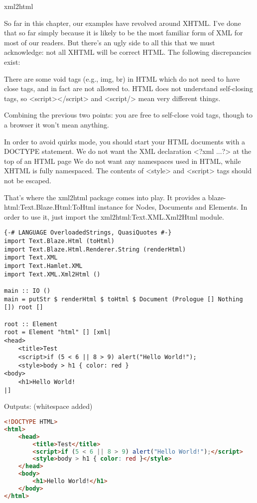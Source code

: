 xml2html

So far in this chapter, our examples have revolved around XHTML. I've done that so far
simply because it is likely to be the most familiar form of XML for most of our readers. But
there's an ugly side to all this that we must acknowledge: not all XHTML will be correct HTML.
The following discrepancies exist:

  
There are some void tags (e.g., img, br) in HTML
which do not need to have close tags, and in fact are not allowed to.
HTML does not understand self-closing tags, so <script></script> and
<script/> mean very different things.

Combining the previous two points: you are free to self-close void tags, though to a browser
it won't mean anything.

In order to avoid quirks mode, you should start your HTML documents with a
DOCTYPE statement.
We do not want the XML declaration <?xml ...?> at the top of an HTML page
We do not want any namespaces used in HTML, while XHTML is fully namespaced.
The contents of <style> and <script>
tags should not be escaped.
  
That's where the xml2html package comes into play. It provides a
blaze-html:Text.Blaze.Html:ToHtml instance for Nodes,
Documents and Elements. In order to use it, just import the
xml2html:Text.XML.Xml2Html module.

\begin{lstlisting}
{-# LANGUAGE OverloadedStrings, QuasiQuotes #-}
import Text.Blaze.Html (toHtml)
import Text.Blaze.Html.Renderer.String (renderHtml)
import Text.XML
import Text.Hamlet.XML
import Text.XML.Xml2Html ()

main :: IO ()
main = putStr $ renderHtml $ toHtml $ Document (Prologue [] Nothing []) root []

root :: Element
root = Element "html" [] [xml|
<head>
    <title>Test
    <script>if (5 < 6 || 8 > 9) alert("Hello World!");
    <style>body > h1 { color: red }
<body>
    <h1>Hello World!
|]
\end{lstlisting}%

Outputs: (whitespace added)

\begin{lstlisting}[language=HTML]
  <!DOCTYPE HTML>
<html>
    <head>
        <title>Test</title>
        <script>if (5 < 6 || 8 > 9) alert("Hello World!");</script>
        <style>body > h1 { color: red }</style>
    </head>
    <body>
        <h1>Hello World!</h1>
    </body>
</html>
\end{lstlisting}%
